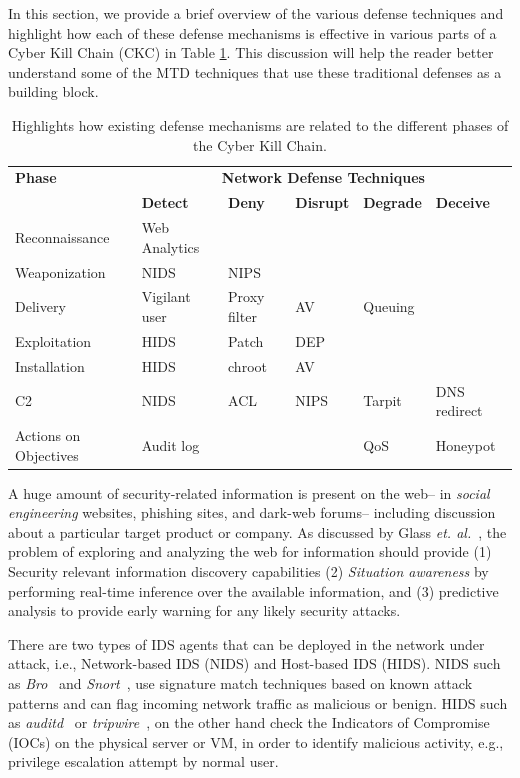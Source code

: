 \label{defense-mech}
In this section, we provide a brief overview of the various defense techniques and highlight how each of these defense mechanisms is effective in various parts of a Cyber Kill Chain (CKC) in Table \ref{tab:2}. This discussion will help the reader better understand some of the MTD techniques that use these traditional defenses as a building block.
\begin{table}[t]
\centering
\begin{tabular}{p{1.8cm} | p{1.06cm} p{0.6cm}p{0.7cm}p{0.8cm}p{0.9cm}}
\hline
\textbf{Phase}&\multicolumn{5}{c}{\textbf{Network Defense Techniques}} \\
& \textbf{Detect} & \textbf{Deny} & \textbf{Disrupt} &\textbf{Degrade} & \textbf{Deceive}\\
\hline
\hline
Reconnaissance & Web Analytics & & & \\
\hline
Weaponization & NIDS & NIPS & & & \\
\hline
Delivery & Vigilant user & Proxy filter & AV & Queuing & \\
\hline
Exploitation & HIDS & Patch & DEP & & \\
\hline
Installation & HIDS & chroot & AV & & \\
\hline
C2 & NIDS & ACL & NIPS & Tarpit & DNS redirect \\
\hline
Actions on Objectives & Audit log & & & QoS & Honeypot \\
\hline
\end{tabular}
\caption{Highlights how existing defense mechanisms are related to the different phases of the Cyber Kill Chain.}
\label{tab:2}
\end{table}

A huge amount of security-related information is present on the web-- in \emph{social engineering} websites, phishing sites, and dark-web forums-- including discussion about a particular target product or company. As discussed by Glass \textit{et. al.}~, the problem of exploring and analyzing the web for information should provide (1) Security relevant information discovery capabilities (2) \emph{Situation awareness} by performing real-time inference over the available information, and (3) predictive analysis to provide early warning for any likely security attacks.

There are two types of IDS agents that can be deployed in the network under attack, i.e., Network-based IDS (NIDS) and Host-based IDS (HIDS). NIDS such as \textit{Bro}~ and \emph{Snort}~, use signature match techniques based on known attack patterns and can flag incoming network traffic as malicious or benign. HIDS such as \textit{auditd}~ or \textit{tripwire}~, on the other hand check the Indicators of Compromise (IOCs) on the physical server or VM, in order to identify malicious activity, e.g., privilege escalation attempt by normal user.

